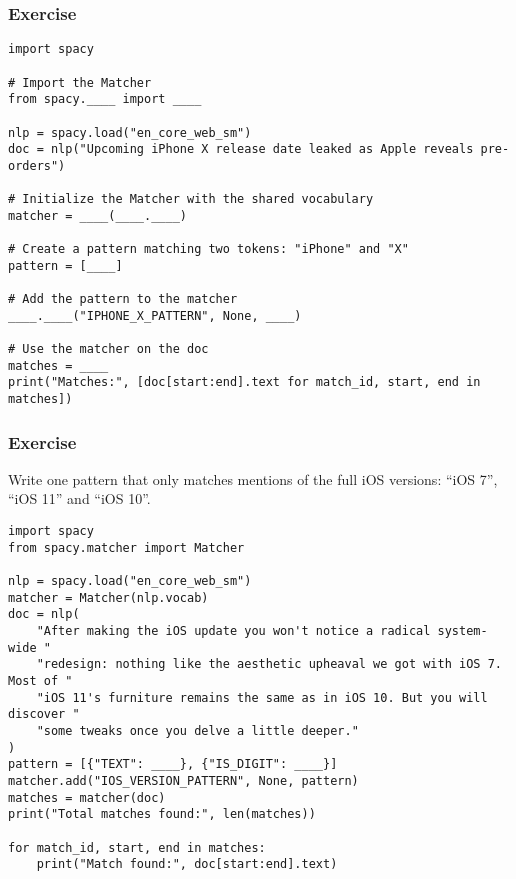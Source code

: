 \begin{frame}[fragile]\frametitle{Exercise}

  \begin{lstlisting}
import spacy

# Import the Matcher
from spacy.____ import ____

nlp = spacy.load("en_core_web_sm")
doc = nlp("Upcoming iPhone X release date leaked as Apple reveals pre-orders")

# Initialize the Matcher with the shared vocabulary
matcher = ____(____.____)

# Create a pattern matching two tokens: "iPhone" and "X"
pattern = [____]

# Add the pattern to the matcher
____.____("IPHONE_X_PATTERN", None, ____)

# Use the matcher on the doc
matches = ____
print("Matches:", [doc[start:end].text for match_id, start, end in matches])

  \end{lstlisting}
	
\end{frame}

\begin{frame}[fragile]\frametitle{Exercise}

Write one pattern that only matches mentions of the full iOS versions: “iOS 7”, “iOS 11” and “iOS 10”.

  \begin{lstlisting}
import spacy
from spacy.matcher import Matcher

nlp = spacy.load("en_core_web_sm")
matcher = Matcher(nlp.vocab)
doc = nlp(
    "After making the iOS update you won't notice a radical system-wide "
    "redesign: nothing like the aesthetic upheaval we got with iOS 7. Most of "
    "iOS 11's furniture remains the same as in iOS 10. But you will discover "
    "some tweaks once you delve a little deeper."
)
pattern = [{"TEXT": ____}, {"IS_DIGIT": ____}]
matcher.add("IOS_VERSION_PATTERN", None, pattern)
matches = matcher(doc)
print("Total matches found:", len(matches))

for match_id, start, end in matches:
    print("Match found:", doc[start:end].text)
  \end{lstlisting}
	
\end{frame}



